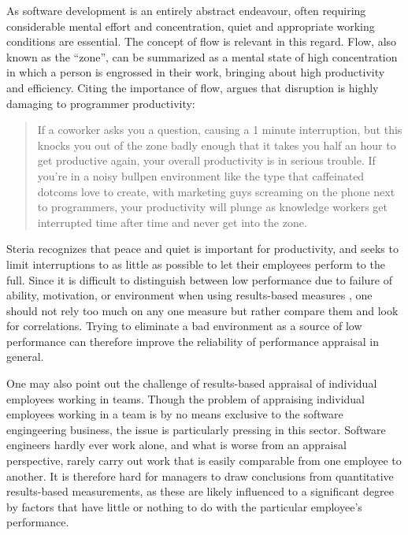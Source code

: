 \documentclass[letterpaper, 12pt]{report}
\begin{document}
As software development is an entirely abstract endeavour, often requiring considerable mental effort and concentration, quiet and appropriate working conditions are essential. 
The concept of flow \parencite{mihaly:flow} is relevant in this regard. 
Flow, also known as the ``zone'', can be summarized as a mental state of high concentration in which a person is engrossed in their work, bringing about high productivity and efficiency.
Citing the importance of flow, \textcite{spolsky:list} argues that disruption is highly damaging to programmer productivity:
\begin{quote}
If a coworker asks you a question, causing a 1 minute interruption, but this knocks you out of the zone badly enough that it takes you half an hour to get productive again, your overall productivity is in serious trouble. 
If you're in a noisy bullpen environment like the type that caffeinated dotcoms love to create, with marketing guys screaming on the phone next to programmers, your productivity will plunge as knowledge workers get interrupted time after time and never get into the zone.
\end{quote}
Steria recognizes that peace and quiet is important for productivity, and seeks to limit interruptions to as little as possible to let their employees perform to the full.
Since it is difficult to distinguish between low performance due to failure of ability, motivation, or environment when using results-based measures \parencite[][387]{textbook}, one should not rely too much on any one measure but rather compare them and look for correlations.
Trying to eliminate a bad environment as a source of low performance can therefore improve the reliability of performance appraisal in general.


One may also point out the challenge of results-based appraisal of individual employees working in teams.
Though the problem of appraising individual employees working in a team is by no means exclusive to the software engingeering business, the issue is particularly pressing in this sector.
Software engineers hardly ever work alone, and what is worse from an appraisal perspective, rarely carry out work that is easily comparable from one employee to another.
It is therefore hard for managers to draw conclusions from quantitative results-based measurements, as these are likely influenced to a significant degree by factors that have little or nothing to do with the particular employee's performance.
\end{document}
